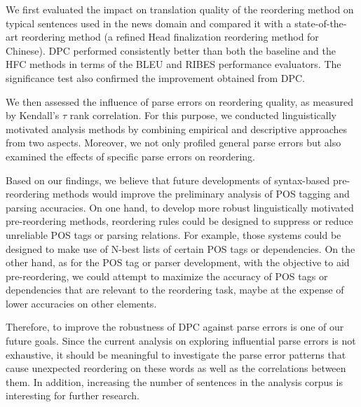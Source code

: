 \documentclass[english]{jnlp_1.4}
\begin{document}
We first evaluated the impact on translation quality of the reordering method 
on typical sentences used in the news domain and compared it with a state-of-the-art 
reordering method (a refined Head finalization reordering method for Chinese). 
DPC performed consistently better than both the baseline and the HFC methods 
in terms of the BLEU and RIBES performance evaluators. 
The significance test also confirmed the improvement obtained from DPC.

We then assessed the influence of parse errors on reordering quality, as measured 
by Kendall's $\tau$ rank correlation. For this purpose, we conducted linguistically 
motivated analysis methods by combining empirical and descriptive approaches 
from two aspects. Moreover, we not only profiled general parse errors but also examined 
the effects of specific parse errors on reordering.

Based on our findings, we believe that future developments of syntax-based pre-reordering 
methods would improve the preliminary analysis of POS tagging and parsing accuracies. 
On one hand, to develop more robust linguistically motivated pre-reordering 
methods, reordering rules could be designed to suppress or reduce unreliable POS tags or 
parsing relations. For example, those systems could be designed to make use of 
N-best lists of certain POS tags or dependencies. 
On the other hand, as for the POS tag or parser development, with the objective 
to aid pre-reordering, we could attempt to maximize the accuracy of POS tags or dependencies 
that are relevant to the reordering task, maybe at the expense of lower accuracies 
on other elements.

Therefore, to improve the robustness of DPC against parse errors is one of 
our future goals. Since the current analysis on exploring influential parse errors 
is not exhaustive, it should be meaningful to investigate the parse error patterns that 
cause unexpected reordering on these words as well as the correlations between them. 
In addition, increasing the number of sentences in the analysis corpus is interesting for further research.
\end{document}
